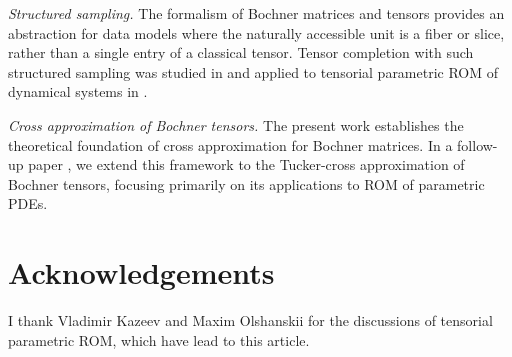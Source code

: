 \documentclass[onefignum,onetabnum]{siamart250211}
\begin{document}
\emph{Structured sampling.}
The formalism of Bochner matrices and tensors provides an abstraction for data models where the naturally accessible unit is a fiber or slice, rather than a single entry of a classical tensor.
Tensor completion with such structured sampling was studied in \cite{sorensen2025multilinear} and applied to tensorial parametric ROM of dynamical systems in \cite{mamonov2022interpolatory, mamonov2024slice, mamonov2024tensorial}.

\emph{Cross approximation of Bochner tensors.}
The present work establishes the theoretical foundation of cross approximation for Bochner matrices.
In a follow-up paper \cite{budzinskiy2025low}, we extend this framework to the Tucker-cross approximation of Bochner tensors, focusing primarily on its applications to ROM of parametric PDEs.

\section*{Acknowledgements}
I thank Vladimir Kazeev and Maxim Olshanskii for the discussions of tensorial parametric ROM, which have lead to this article.



\end{document}
